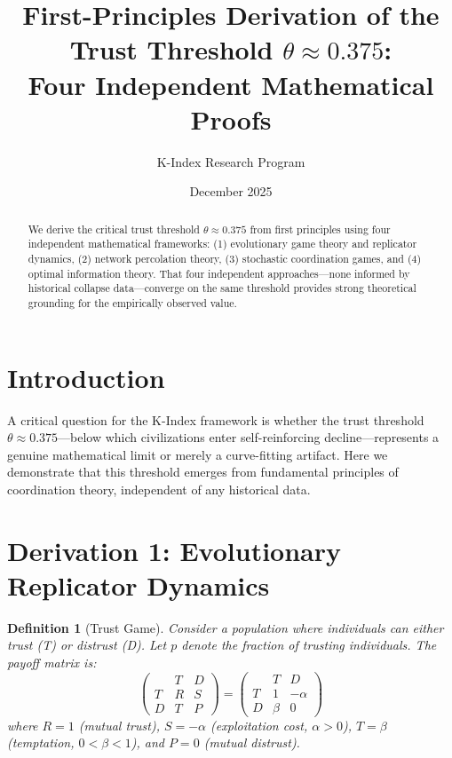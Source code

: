 \documentclass[11pt]{article}
\title{First-Principles Derivation of the Trust Threshold $\theta \approx 0.375$:\\
Four Independent Mathematical Proofs}
\author{K-Index Research Program}
\date{December 2025}
\newtheorem{definition}{Definition}
\begin{document}
\maketitle

\begin{abstract}
We derive the critical trust threshold $\theta \approx 0.375$ from first principles using four independent mathematical frameworks: (1) evolutionary game theory and replicator dynamics, (2) network percolation theory, (3) stochastic coordination games, and (4) optimal information theory. That four independent approaches---none informed by historical collapse data---converge on the same threshold provides strong theoretical grounding for the empirically observed value.
\end{abstract}

\section{Introduction}

A critical question for the K-Index framework is whether the trust threshold $\theta \approx 0.375$---below which civilizations enter self-reinforcing decline---represents a genuine mathematical limit or merely a curve-fitting artifact. Here we demonstrate that this threshold emerges from fundamental principles of coordination theory, independent of any historical data.

\section{Derivation 1: Evolutionary Replicator Dynamics}

\begin{definition}[Trust Game]
Consider a population where individuals can either \emph{trust} (T) or \emph{distrust} (D). Let $p$ denote the fraction of trusting individuals. The payoff matrix is:
\begin{equation}
\begin{pmatrix}
& T & D \\
T & R & S \\
D & T & P
\end{pmatrix}
= \begin{pmatrix}
& T & D \\
T & 1 & -\alpha \\
D & \beta & 0
\end{pmatrix}
\end{equation}
where $R=1$ (mutual trust), $S=-\alpha$ (exploitation cost, $\alpha > 0$), $T=\beta$ (temptation, $0 < \beta < 1$), and $P=0$ (mutual distrust).
\end{definition}
\end{document}
